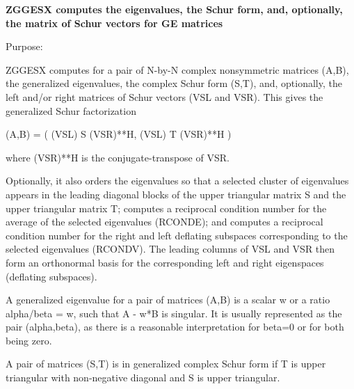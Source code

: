 {\bfseries  Z\+G\+G\+E\+S\+X computes the eigenvalues, the Schur form, and, optionally, the matrix of Schur vectors for G\+E matrices} 

 \begin{DoxyParagraph}{Purpose\+: }
\begin{DoxyVerb} ZGGESX computes for a pair of N-by-N complex nonsymmetric matrices
 (A,B), the generalized eigenvalues, the complex Schur form (S,T),
 and, optionally, the left and/or right matrices of Schur vectors (VSL
 and VSR).  This gives the generalized Schur factorization

      (A,B) = ( (VSL) S (VSR)**H, (VSL) T (VSR)**H )

 where (VSR)**H is the conjugate-transpose of VSR.

 Optionally, it also orders the eigenvalues so that a selected cluster
 of eigenvalues appears in the leading diagonal blocks of the upper
 triangular matrix S and the upper triangular matrix T; computes
 a reciprocal condition number for the average of the selected
 eigenvalues (RCONDE); and computes a reciprocal condition number for
 the right and left deflating subspaces corresponding to the selected
 eigenvalues (RCONDV). The leading columns of VSL and VSR then form
 an orthonormal basis for the corresponding left and right eigenspaces
 (deflating subspaces).

 A generalized eigenvalue for a pair of matrices (A,B) is a scalar w
 or a ratio alpha/beta = w, such that  A - w*B is singular.  It is
 usually represented as the pair (alpha,beta), as there is a
 reasonable interpretation for beta=0 or for both being zero.

 A pair of matrices (S,T) is in generalized complex Schur form if T is
 upper triangular with non-negative diagonal and S is upper
 triangular.\end{DoxyVerb}
 
\end{DoxyParagraph}

